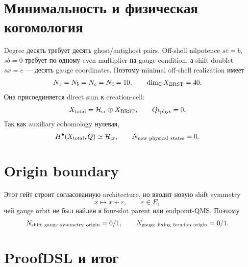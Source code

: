 \section{Минимальность и физическая когомология}

Degree десять требует десять ghost/antighost pairs. Off-shell nilpotence
$s\bar c=b$, $sb=0$ требует по одному even multiplier на gauge condition,
а shift-doublet $sx=c$ --- десять gauge coordinates. Поэтому minimal
off-shell realization имеет
\begin{equation}
 N_x=N_b=N_c=N_{\bar c}=10,
 \qquad
 \dim_{\mathbb C}X_{\rm BRST}=40.
 \label{eq:v9-kms-brst-minimal-count}
\end{equation}
Она присоединяется direct sum к creation-cell:
\begin{equation}
 X_{\rm total}=\mathcal H_{\rm cr}\oplus X_{\rm BRST},
 \qquad
 Q\iota_{\rm phys}=0.
 \label{eq:v9-kms-brst-physical-inclusion}
\end{equation}
Так как auxiliary cohomology нулевая,
\begin{equation}
 H^\bullet(X_{\rm total},Q)
 \simeq\mathcal H_{\rm cr},
 \qquad N_{\rm new\ physical\ states}=0.
 \label{eq:v9-kms-brst-physical-cohomology}
\end{equation}

\section{Origin boundary}

Этот гейт строит согласованную architecture, но вводит новую shift symmetry
\begin{equation}
 x\longmapsto x+\varepsilon,
 \qquad \varepsilon\in E,
 \label{eq:v9-kms-brst-shift-symmetry}
\end{equation}
чей gauge orbit не был найден в four-slot parent или endpoint-QMS.
Поэтому
\begin{equation}
 N_{\rm shift\ gauge\ symmetry\ origin}=0/1,
 \qquad
 N_{\rm gauge\ fixing\ fermion\ origin}=0/1.
 \label{eq:v9-kms-brst-origin-boundary}
\end{equation}

\section{ProofDSL и итог}

